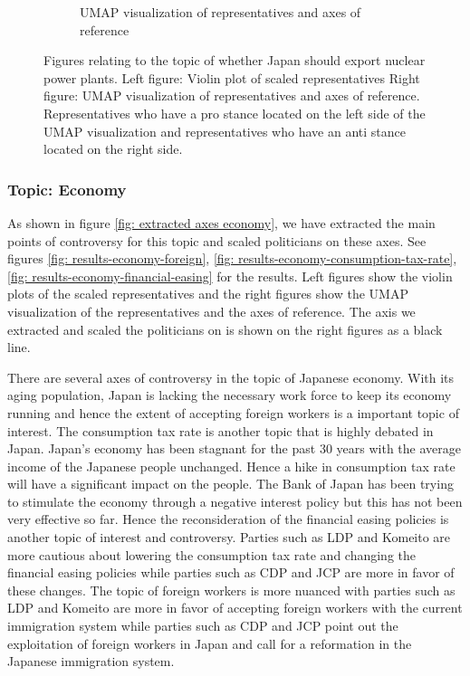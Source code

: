 \documentclass[final,5p,times,twocolumn,authoryear]{elsarticle}
\begin{document}
\begin{figure}[h]
\begin{subfigure}{0.22\textwidth}
      \caption{UMAP visualization of representatives and axes of reference}
    \end{subfigure}
\caption{Figures relating to the topic of whether Japan should export nuclear power plants. Left figure: Violin plot of scaled representatives Right figure: UMAP visualization of representatives and axes of reference. Representatives who have a pro stance located on the left side of the UMAP visualization and representatives who have an anti stance located on the right side.}
\label{fig: results-nuclear-export}
\end{figure}

\FloatBarrier

\subsubsection{Topic: Economy}
As shown in figure \ref{fig: extracted axes economy}, we have extracted the main points of controversy for this topic and scaled politicians on these axes. See figures \ref{fig: results-economy-foreign}, \ref{fig: results-economy-consumption-tax-rate}, \ref{fig: results-economy-financial-easing} for the results. Left figures show the violin plots of the scaled representatives and the right figures show the UMAP visualization of the representatives and the axes of reference. The axis we extracted and scaled the politicians on is shown on the right figures as a black line. 

There are several axes of controversy in the topic of Japanese economy. With its aging population, Japan is lacking the necessary work force to keep its economy running and hence the extent of accepting foreign workers is a important topic of interest. The consumption tax rate is another topic that is highly debated in Japan. Japan's economy has been stagnant for the past 30 years with the average income of the Japanese people unchanged. Hence a hike in consumption tax rate will have a significant impact on the people. The Bank of Japan has been trying to stimulate the economy through a negative interest policy but this has not been very effective so far. Hence the reconsideration of the financial easing policies is another topic of interest and controversy. Parties such as LDP and Komeito are more cautious about lowering the consumption tax rate and changing the financial easing policies while parties such as CDP and JCP are more in favor of these changes. The topic of foreign workers is more nuanced with parties such as LDP and Komeito are more in favor of accepting foreign workers with the current immigration system while parties such as CDP and JCP point out the exploitation of foreign workers in Japan and call for a reformation in the Japanese immigration system. 
\end{document}
